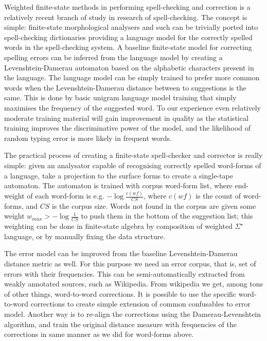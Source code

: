 \documentclass{llncs}
\begin{document}
Weighted finite-state methods in performing spell-checking and correction is a
relatively recent branch of study in research of spell-checking. The concept is
simple: finite-state morphological analysers and such can be trivially ported
into spell-checking dictionaries providing a language model for the correctly
spelled words in the spell-checking system. A baseline finite-state model for
correcting spelling errors can be inferred from the language model by creating
a Levenshtein-Damerau automaton based on the alphabetic characters present in
the language. The language model can be simply trained to prefer more common
words when the Levenshtein-Damerau distance between to suggestions is the same.
This is done by basic unigram language model training that simply maximises
the frequency of the suggested word. To our experience even relatively moderate
training material will gain improvement in quality as the statistical training
improves the discriminative power of the model, and the likelihood of random
typing error is more likely in frequent words.

The practical process of creating a finite-state spell-checker and corrector
is really simple: given an analysator capable of recognising correctly spelled
word-forms of a language, take a projection to the surface forms to create a
single-tape automaton. The automaton is trained with corpus word-form list, 
where end-weight of each word-form is e.g. $-\log\frac{c(wf)}{CS}$, where 
$c(wf)$ is the count of word-forms, and $CS$ is the corpus size. Words not
found in the corpus are given some weight $w_{max} > -\log\frac{1}{CS}$ to
push them in the bottom of the suggestion list; this weighting can be done
in finite-state algebra by composition of weighted $\Sigma^{\star}$ language,
or by manually fixing the data structure.

The error model can be improved from the baseline Levenshtein-Damerau distance
metric as well. For this purpose we need an error corpus, that is, set of
errors with their frequencies. This can be semi-automatically extracted from
weakly annotated sources, such as Wikipedia. From wikipedia we get, among tons
of other things, word-to-word corrections. It is possible to use the specific
word-to-word corrections to create simple extension of common confusables to
error model. Another way is to re-align the corrections using the
Damerau-Levenshtein algorithm, and train the original distance measure with
frequencies of the corrections in same manner as we did for word-forms above.
\end{document}
